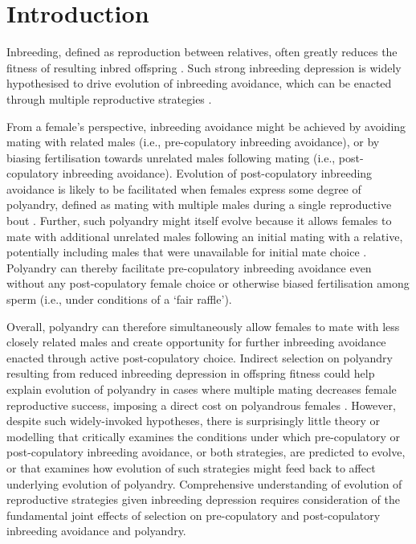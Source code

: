 \documentclass[10pt,letterpaper]{article}
\begin{document}
\section*{Introduction}

Inbreeding, defined as reproduction between relatives, often greatly reduces the fitness of resulting inbred offspring \cite[termed `inbreeding depression';][]{Charlesworth1999, Keller2002, Charlesworth2009}. Such strong inbreeding depression is widely hypothesised to drive evolution of inbreeding avoidance, which can be enacted through multiple reproductive strategies \cite[][]{Parker1979, Parker2006, Pusey1996, Szulkin2012}. 

From a female's perspective, inbreeding avoidance might be achieved by avoiding mating with related males (i.e., pre-copulatory inbreeding avoidance), or by biasing fertilisation towards unrelated males following mating (i.e., post-copulatory inbreeding avoidance). Evolution of post-copulatory inbreeding avoidance is likely to be facilitated when females express some degree of polyandry, defined as mating with multiple males during a single reproductive bout \cite[but see][]{Dougherty2016}. Further, such polyandry might itself evolve because it allows females to mate with additional unrelated males following an initial mating with a relative, potentially including males that were unavailable for initial mate choice \cite[e.g.,][]{Reid2015, Duthie}. Polyandry can thereby facilitate pre-copulatory inbreeding avoidance even without any post-copulatory female choice or otherwise biased fertilisation among sperm (i.e., under conditions of a `fair raffle').

Overall, polyandry can therefore simultaneously allow females to mate with less closely related males and create opportunity for further inbreeding avoidance enacted through active post-copulatory choice. Indirect selection on polyandry resulting from reduced inbreeding depression in offspring fitness could help explain evolution of polyandry in cases where multiple mating decreases female reproductive success, imposing a direct cost on polyandrous females \cite[][]{Zeh1997, Jennions2000, Tregenza2002}. However, despite such widely-invoked hypotheses, there is surprisingly little theory or modelling that critically examines the conditions under which pre-copulatory or post-copulatory inbreeding avoidance, or both strategies, are predicted to evolve, or that examines how evolution of such strategies might feed back to affect underlying evolution of polyandry. Comprehensive understanding of evolution of reproductive strategies given inbreeding depression requires consideration of the fundamental joint effects of selection on pre-copulatory and post-copulatory inbreeding avoidance and polyandry.
\end{document}
